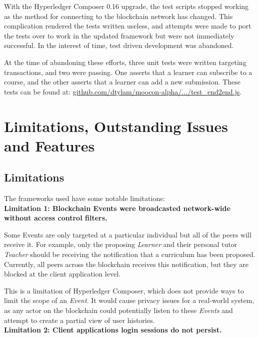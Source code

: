 With the Hyperledger Composer 0.16 upgrade, the test scripts stopped working as 
the method for connecting to the blockchain network has changed. This complication 
rendered the tests written useless, and attempts were made to port the tests over 
to work in the updated framework but were not immediately successful. In the interest of 
time, test driven development was abandoned.

At the time of abandoning these efforts, three unit tests were written targeting transactions, 
and two were passing. One asserts that a learner can subscribe to a course, 
and the other asserts that a learner can add a new submission. 
These tests can be found at: \href{https://github.com/dtylam/moocon-alpha/blob/master/test/test_end2end.js}
{\underline{github.com/dtylam/moocon-alpha/.../test\_end2end.js}}.

\section{Limitations, Outstanding Issues and Features}

\subsection{Limitations}

The frameworks used have some notable limitations:
\vspace{0.25cm}\\
\textbf{Limitation 1: Blockchain Events were broadcasted network-wide without access control filters.}

Some Events are only targeted at a particular individual but all of the peers will receive it.
For example, only the proposing \textit{Learner} and their personal tutor \textit{Teacher} should 
be receiving the notification that a curriculum has been proposed. Currently, all peers across the 
blockchain receives this notification, but they are blocked at the client application level.

This is a limitation of Hyperledger Composer, which does not provide ways to limit the scope of an \textit{Event}.
It would cause privacy issues for a real-world system, as any actor on the blockchain could potentially 
listen to these \textit{Events} and attempt to create a partial view of user histories.
\vspace{0.25cm}\\
\textbf{Limitation 2: Client applications login sessions do not persist.}

